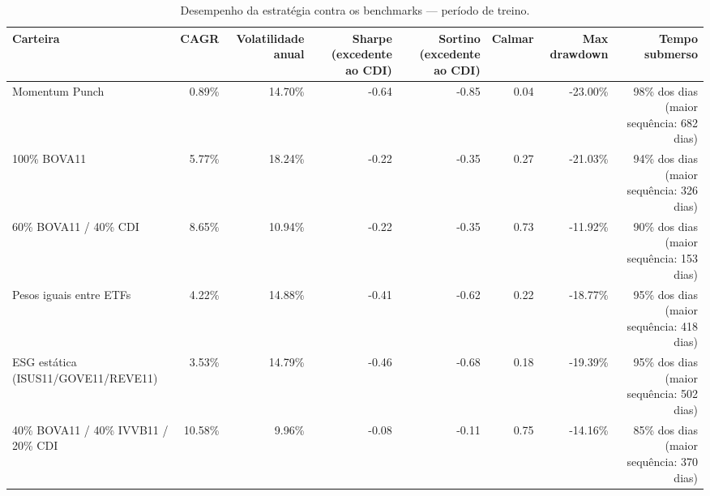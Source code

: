 \begin{table}[htbp]
\centering
\caption{Desempenho da estratégia contra os benchmarks — período de treino.}
\label{tab:performance-treino}
\begin{tabular}{lrrrrrrr}
\toprule
Carteira & CAGR & Volatilidade anual & Sharpe (excedente ao CDI) & Sortino (excedente ao CDI) & Calmar & Max drawdown & Tempo submerso \\
\midrule
Momentum Punch & 0.89\% & 14.70\% & -0.64 & -0.85 & 0.04 & -23.00\% & 98\% dos dias (maior sequência: 682 dias) \\
100\% BOVA11 & 5.77\% & 18.24\% & -0.22 & -0.35 & 0.27 & -21.03\% & 94\% dos dias (maior sequência: 326 dias) \\
60\% BOVA11 / 40\% CDI & 8.65\% & 10.94\% & -0.22 & -0.35 & 0.73 & -11.92\% & 90\% dos dias (maior sequência: 153 dias) \\
Pesos iguais entre ETFs & 4.22\% & 14.88\% & -0.41 & -0.62 & 0.22 & -18.77\% & 95\% dos dias (maior sequência: 418 dias) \\
ESG estática (ISUS11/GOVE11/REVE11) & 3.53\% & 14.79\% & -0.46 & -0.68 & 0.18 & -19.39\% & 95\% dos dias (maior sequência: 502 dias) \\
40\% BOVA11 / 40\% IVVB11 / 20\% CDI & 10.58\% & 9.96\% & -0.08 & -0.11 & 0.75 & -14.16\% & 85\% dos dias (maior sequência: 370 dias) \\
\bottomrule
\end{tabular}
\end{table}

